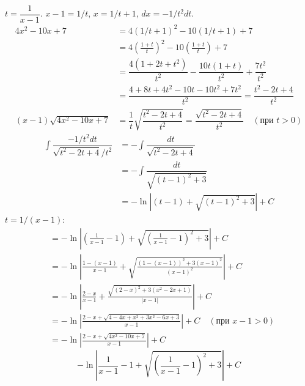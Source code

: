 \documentclass{report}
\begin{document}
\sol
{} $t = \dfrac{1}{x-1}$.  $x-1 = 1/t$, $x = 1/t + 1$, $dx = -1/t^2 dt$.
\begin{align*}
4x^2-10x+7 &= 4(1/t+1)^2 - 10(1/t+1) + 7 \\
&= 4\left(\frac{1+t}{t}\right)^2 - 10\left(\frac{1+t}{t}\right) + 7 \\
&= \dfrac{4(1+2t+t^2)}{t^2} - \dfrac{10t(1+t)}{t^2} + \dfrac{7t^2}{t^2} \\
&= \dfrac{4+8t+4t^2 - 10t-10t^2 + 7t^2}{t^2} = \dfrac{t^2-2t+4}{t^2} \\
(x-1)\sqrt{4x^2-10x+7} &= \dfrac{1}{t} \sqrt{\dfrac{t^2-2t+4}{t^2}} = \dfrac{\sqrt{t^2-2t+4}}{t^2} \quad (\text{при } t>0)
\end{align*}
\begin{align*}
\int \dfrac{-1/t^2 dt}{\sqrt{t^2-2t+4}/t^2} &= - \int \dfrac{dt}{\sqrt{t^2-2t+4}} \\
&= - \int \dfrac{dt}{\sqrt{(t-1)^2+3}} \\
&= - \ln \left| (t-1) + \sqrt{(t-1)^2+3} \right| + C
\end{align*}
 $t = 1/(x-1)$:
\begin{align*}
&= - \ln \left| \left(\frac{1}{x-1}-1\right) + \sqrt{\left(\frac{1}{x-1}-1\right)^2+3} \right| + C \\
&= - \ln \left| \frac{1-(x-1)}{x-1} + \sqrt{\frac{(1-(x-1))^2 + 3(x-1)^2}{(x-1)^2}} \right| + C \\
&= - \ln \left| \frac{2-x}{x-1} + \frac{\sqrt{(2-x)^2+3(x^2-2x+1)}}{|x-1|} \right| + C \\
&= - \ln \left| \frac{2-x + \sqrt{4-4x+x^2+3x^2-6x+3}}{x-1} \right| + C \quad (\text{при } x-1>0) \\
&= - \ln \left| \frac{2-x + \sqrt{4x^2-10x+7}}{x-1} \right| + C
\end{align*}
\[
- \ln \left| \frac{1}{x-1}-1 + \sqrt{\left(\frac{1}{x-1}-1\right)^2+3} \right| + C
\]


\end{document}
